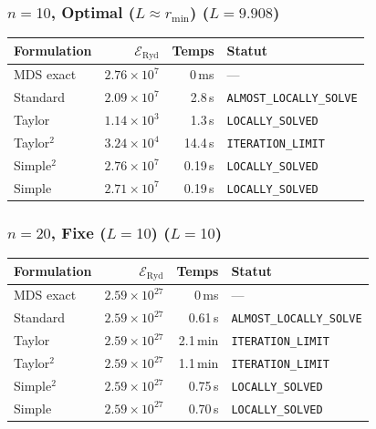 \subsubsection{$n=10$, Optimal ($L{\approx}r_{\min}$) ($L=9.908$)}
\begin{longtable}{@{}lrrl@{}}
  \toprule
  Formulation & $\mathcal{E}_{\mathrm{Ryd}}$ & Temps & Statut \\
  \midrule
  \endhead
  MDS exact & $2.76\times10^{7}$ & 0\,ms & --- \\
  Standard & $2.09\times10^{7}$ & 2.8\,s & \texttt{ALMOST\_LOCALLY\_SOLVE} \\
  Taylor & $1.14\times10^{3}$ & 1.3\,s & \texttt{LOCALLY\_SOLVED} \\
  Taylor$^2$ & $3.24\times10^{4}$ & 14.4\,s & \texttt{ITERATION\_LIMIT} \\
  Simple$^2$ & $2.76\times10^{7}$ & 0.19\,s & \texttt{LOCALLY\_SOLVED} \\
  Simple & $2.71\times10^{7}$ & 0.19\,s & \texttt{LOCALLY\_SOLVED} \\
  \bottomrule
\end{longtable}

\subsubsection{$n=20$, Fixe ($L{=}10$) ($L=10$)}
\begin{longtable}{@{}lrrl@{}}
  \toprule
  Formulation & $\mathcal{E}_{\mathrm{Ryd}}$ & Temps & Statut \\
  \midrule
  \endhead
  MDS exact & $2.59\times10^{27}$ & 0\,ms & --- \\
  Standard & $2.59\times10^{27}$ & 0.61\,s & \texttt{ALMOST\_LOCALLY\_SOLVE} \\
  Taylor & $2.59\times10^{27}$ & 2.1\,min & \texttt{ITERATION\_LIMIT} \\
  Taylor$^2$ & $2.59\times10^{27}$ & 1.1\,min & \texttt{ITERATION\_LIMIT} \\
  Simple$^2$ & $2.59\times10^{27}$ & 0.75\,s & \texttt{LOCALLY\_SOLVED} \\
  Simple & $2.59\times10^{27}$ & 0.70\,s & \texttt{LOCALLY\_SOLVED} \\
  \bottomrule
\end{longtable}

